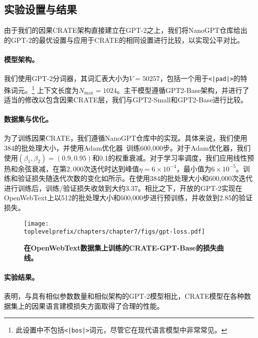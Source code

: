 \documentclass[../../book-main.tex]{subfiles}
\begin{document}
\subsection{实验设置与结果}

由于我们的因果CRATE架构直接建立在GPT-2之上，我们将NanoGPT仓库\citep{nanogpt}给出的GPT-2的最优设置与应用于CRATE的相同设置进行比较，以实现公平对比。

\paragraph{模型架构。} 我们使用GPT-2分词器，其词汇表大小为\(V = 50257\)，包括一个用于\texttt{<|pad|>}的特殊词元。\footnote{此设置中不包括\texttt{<|bos|>}词元，尽管它在现代语言模型中非常常见。} 上下文长度为\(N_{\max} = 1024\)。主干模型遵循GPT2-Base架构\citep{radford2019language}，并进行了适当的修改以包含因果CRATE层，我们与GPT2-Small和GPT2-Base进行比较。

\paragraph{数据集与优化。} 为了训练因果CRATE，我们遵循NanoGPT仓库\citep{nanogpt}中的实现。具体来说，我们使用384的批处理大小，并使用Adam优化器~\citep{kingma2014adam}训练600,000步。对于Adam优化器，我们使用$(\beta_1, \beta_2)=(0.9, 0.95)$和0.1的权重衰减。对于学习率调度，我们应用线性预热和余弦衰减，在第$2,000$次迭代时达到峰值$\eta=6\times 10^{-4}$，最小值为$6\times 10^{-5}$。训练和验证损失随迭代次数的变化如所示。在使用384的批处理大小和600,000次迭代进行训练后，训练/验证损失收敛到大约$3.37$。相比之下，开放的GPT-2实现在OpenWebText上以512的批处理大小和600,000步进行预训练，并收敛到$2.85$的验证损失\citep{nanogpt}。

\begin{figure}
    \centering
    \texttt{[image: \\toplevelprefix/chapters/chapter7/figs/gpt-loss.pdf]}
    \caption{\bf 在OpenWebText数据集上训练的CRATE-GPT-Base的损失曲线。}
    \label{fig:crate-text-evals}
\end{figure}

\paragraph{实验结果。}

表明，与具有相似参数数量和相似架构的GPT-2模型相比，CRATE模型在各种数据集上的因果语言建模损失方面取得了合理的性能。
\end{document}
